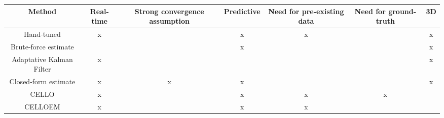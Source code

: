 \begin{tabu}{ccccccc}
\toprule
Method & Real-time &  \parbox[t]{2cm}{ \centering Strong convergence assumption} &
                          Predictive & \parbox[t]{2cm}{\centering Need for pre-existing data} &
                          \parbox[t]{2cm}{\centering Need for ground-truth} & 3D \\ \midrule
Hand-tuned               & x      &       & x   & x &   & x \\
Brute-force estimate     &        &       &  x  &   &   & x \\
Adaptative Kalman Filter & x      &       &     &   &   & x \\
Closed-form estimate     & x      & x     & x   &   &   & x \\
\ac{CELLO}               & x      &       & x   & x & x &   \\
\ac{CELLOEM}             & x      &       & x   & x &   &   \\ \bottomrule
\end{tabu}